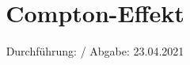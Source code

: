 

\subject{V603}
\title{Compton-Effekt}
\date{%
  Durchführung: /
  \hspace{3em}
  Abgabe: 23.04.2021
}



\maketitle
\thispagestyle{empty}
\tableofcontents
\newpage






\printbibliography{}


